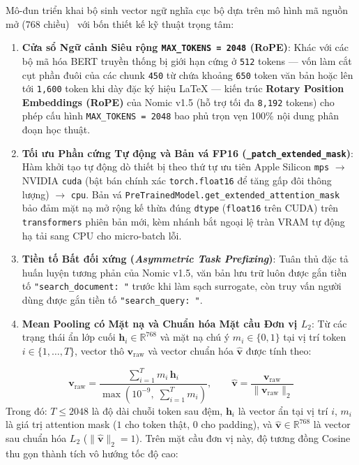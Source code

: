 Mô-đun  triển khai bộ sinh vector ngữ nghĩa cục bộ dựa trên mô hình mã nguồn mở  (768 chiều)~\cite{nussbaum2024nomic,nomicmodelcard2024} với bốn thiết kế kỹ thuật trọng tâm:
\begin{enumerate}[label=\textbf{\arabic*.}]
  \item \textbf{Cửa sổ Ngữ cảnh Siêu rộng \texttt{MAX\_TOKENS = 2048} (RoPE)}: Khác với các bộ mã hóa BERT truyền thống bị giới hạn cứng ở \texttt{512} tokens --- vốn làm cắt cụt phần đuôi của các chunk \texttt{450} từ chứa khoảng \texttt{650} token văn bản hoặc lên tới \texttt{1,600} token khi dày đặc ký hiệu LaTeX --- kiến trúc \textbf{Rotary Position Embeddings (RoPE)} của Nomic v1.5 (hỗ trợ tối đa \texttt{8,192} tokens) cho phép cấu hình \texttt{MAX\_TOKENS = 2048} bao phủ trọn vẹn 100\% nội dung phân đoạn học thuật.
  \item \textbf{Tối ưu Phần cứng Tự động và Bản vá FP16 (\texttt{\_patch\_extended\_mask})}: Hàm khởi tạo tự động dò thiết bị theo thứ tự ưu tiên Apple Silicon \texttt{mps} $\rightarrow$ NVIDIA \texttt{cuda} (bật bán chính xác \texttt{torch.float16} để tăng gấp đôi thông lượng) $\rightarrow$ \texttt{cpu}. Bản vá \texttt{PreTrainedModel.get\_extended\_attention\_mask} bảo đảm mặt nạ mở rộng kế thừa đúng \texttt{dtype} (\texttt{float16} trên CUDA) trên \texttt{transformers} phiên bản mới, kèm nhánh bắt ngoại lệ tràn VRAM tự động hạ tải sang CPU cho micro-batch lỗi.
  \item \textbf{Tiền tố Bất đối xứng (\textit{Asymmetric Task Prefixing})}: Tuân thủ đặc tả huấn luyện tương phản của Nomic v1.5, văn bản lưu trữ luôn được gắn tiền tố \texttt{"search\_document: "} trước khi làm sạch surrogate, còn truy vấn người dùng được gắn tiền tố \texttt{"search\_query: "}.
  \item \textbf{Mean Pooling có Mặt nạ và Chuẩn hóa Mặt cầu Đơn vị $L_2$}: Từ các trạng thái ẩn lớp cuối $\mathbf{h}_i \in \mathbb{R}^{768}$ và mặt nạ chú ý $m_i \in \{0, 1\}$ tại vị trí token $i \in \{1, \dots, T\}$, vector thô $\mathbf{v}_{\text{raw}}$ và vector chuẩn hóa $\hat{\mathbf{v}}$ được tính theo:
\end{enumerate}
\begin{equation}
  \mathbf{v}_{\text{raw}} = \frac{\sum_{i=1}^{T} m_i \, \mathbf{h}_i}{\max\!\left(10^{-9},\; \sum_{i=1}^{T} m_i\right)}, \qquad \hat{\mathbf{v}} = \frac{\mathbf{v}_{\text{raw}}}{\|\mathbf{v}_{\text{raw}}\|_2}
  \label{eq:ch2_mean_pool}
\end{equation}
\noindent Trong đó: $T \le 2048$ là độ dài chuỗi token sau đệm, $\mathbf{h}_i$ là vector ẩn tại vị trí $i$, $m_i$ là giá trị attention mask ($1$ cho token thật, $0$ cho padding), và $\hat{\mathbf{v}} \in \mathbb{R}^{768}$ là vector sau chuẩn hóa $L_2$ ($\|\hat{\mathbf{v}}\|_2 = 1$). Trên mặt cầu đơn vị này, độ tương đồng Cosine thu gọn thành tích vô hướng tốc độ cao:
